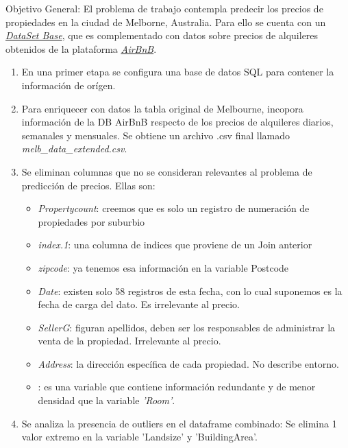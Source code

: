 \documentclass[11pt,a4paper,dvipsnames]{article}
\begin{document}
	
	Objetivo General: El problema de trabajo contempla predecir los precios de propiedades en la ciudad de Melborne, Australia. Para ello se cuenta con un \href{https://cs.famaf.unc.edu.ar/~mteruel/datasets/diplodatos/melb_data.csv}{\color{Blue4}\textit{DataSet Base}}, que es complementado con datos sobre precios de alquileres obtenidos de la plataforma \href{https://cs.famaf.unc.edu.ar/~mteruel/datasets/diplodatos/cleansed_listings_dec18.csv}{\color{Blue4}\textit{AirBnB}}.
	
	\begin{enumerate}
		
		\item En una primer etapa se configura una base de datos SQL para contener la información de orígen.

		\item Para enriquecer con datos la tabla original de Melbourne, incopora información de la DB AirBnB respecto de los precios de alquileres diarios, semanales y mensuales. Se obtiene un archivo .csv final llamado \textit{melb\_data\_extended.csv}.
		
		\item Se eliminan columnas que no se consideran relevantes al problema de predicción de precios. Ellas son:

		\begin{itemize}
			\item \textit{Propertycount}: creemos que es solo un registro de numeración de propiedades por suburbio
			\item \textit{index.1}: una columna de indices que proviene de un Join anterior
			\item \textit{zipcode}: ya tenemos esa información en la variable Postcode
			\item \textit{Date}: existen solo 58 registros de esta fecha, con lo cual suponemos es la fecha de carga del dato. Es irrelevante al precio.
			\item \textit{SellerG}: figuran apellidos, deben ser los responsables de administrar la venta de la propiedad. Irrelevante al precio.
			\item \textit{Address}: la dirección específica de cada propiedad. No describe entorno.
			\item {}: es una variable que contiene información redundante y de menor densidad que la variable \textit{'Room'}.
		\end{itemize}
		
		\item Se analiza la presencia de outliers en el dataframe combinado: Se elimina 1 valor extremo en la variable 'Landsize' y 'BuildingArea'.
		

\end{enumerate}
\end{document}
